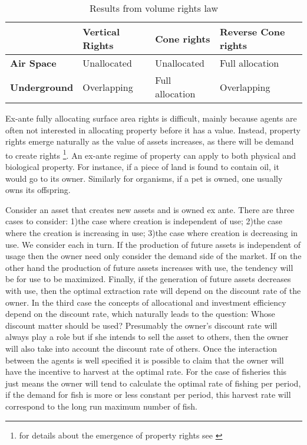 \documentclass[12pt]{report}
\numberwithin{equation}{section}
\begin{document}
\begin{table}[h]
\begin{tabular}{|l|l|l|l|}
\hline
                     & \textbf{Vertical Rights}       & \textbf{Cone rights}          & \textbf{Reverse Cone rights}  \\ \hline
\textbf{Air Space}   & Unallocated             & Unallocated            & Full allocation \\ \hline
\textbf{Underground} & Overlapping & Full allocation & Overlapping       \\ \hline
\end{tabular}
\caption{Results from volume rights law}
\label{Volume}
\end{table}

Ex-ante fully allocating surface area rights is difficult, mainly because agents are often not interested in allocating property before it has a value. Instead, property rights emerge naturally as the value of assets increases, as there will be demand to create rights \footnote{for details about the emergence of property rights see \cite{Alchian1973}}. An ex-ante regime of property can apply to both physical and biological property. For instance, if a piece of land is found to contain oil, it would go to its owner. Similarly for organisms, if a pet is owned, one usually owns its offspring.

Consider an asset that creates new assets and is owned ex ante. There are three cases to consider: 1)the case where creation is independent of use; 2)the case where the creation is increasing in use;  3)the case where creation is decreasing in use. We consider each in turn. If the production of future assets is independent of usage then the owner need only consider the demand side of the market. If on the other hand the production of future assets increases with use, the tendency will be for use to be maximized. Finally, if the generation of future assets decreases with use, then the optimal extraction rate will depend on the discount rate of the owner. In the third case the concepts of allocational and investment efficiency depend on the discount rate, which naturally leads to the question: Whose discount matter should be used? Presumably the owner's discount rate will always play a role but if she intends to sell the asset to others, then the owner will also take into account the discount rate of others. Once the interaction between the agents is well specified it is possible to claim that the owner will have the incentive to harvest at the optimal rate. For the case of fisheries this just means the owner will tend to calculate the optimal rate of fishing per period, if the demand for fish is more or less constant per period, this harvest rate will correspond to the long run maximum number of fish.
\end{document}
